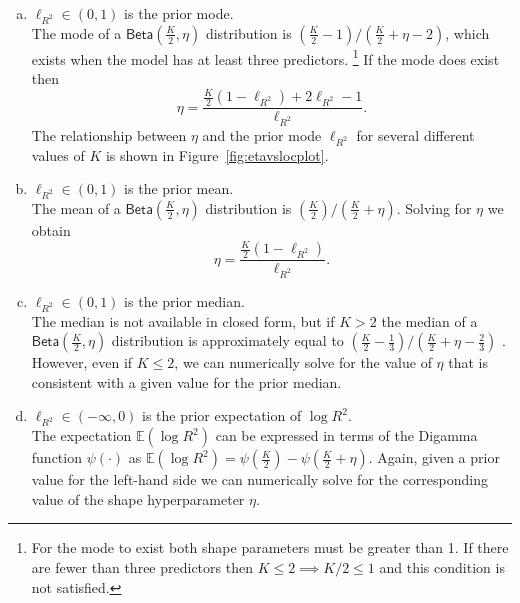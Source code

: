 \documentclass[11pt]{article}
\newcommand{\locRsq}{\ell_{R^2}}
\newcommand{\halfK}{\frac{K}{2}}
\newcommand{\Betadist}[2]{\mathsf{Beta}\left(#1,#2\right)}
\newcommand{\Digamma}[1]{\psi\left(#1\right)}
\begin{document}
\begin{enumerate}[(a)]
\item $\locRsq \in \left(0,1\right)$ is the prior mode. \\[5pt]
%
The mode of a $\Betadist{\halfK}{\eta}$ distribution is
$\left(\halfK - 1\right) / \left(\halfK + \eta - 2\right)$, which exists when
the model has at least three predictors.%
\footnote{For the mode to exist both shape parameters must be greater than 1. If
there are fewer than three predictors then $K \leq 2 \implies K/2 \leq 1$ and
this condition is not satisfied.}
If the mode does exist then
%
$$\eta = \frac{\halfK \left(1 - \locRsq\right) + 2\locRsq - 1}{\locRsq}.$$
%
The relationship between $\eta$ and the prior mode $\locRsq$ for
several different values of $K$ is shown in Figure~\ref{fig:etavslocplot}.

\item $\locRsq \in \left(0,1\right)$ is the prior mean. \\[5pt]
%
The mean of a $\Betadist{\halfK}{\eta}$ distribution is
$\left(\halfK\right) / \left(\halfK + \eta\right)$. Solving for $\eta$ we obtain
%
$$\eta = \frac{\halfK \left(1 - \locRsq \right)}{\locRsq}.$$

\item $\locRsq \in \left(0,1\right)$ is the prior median. \\[5pt]
%
The median is not available in closed form, but if $K > 2$ the median of a
$\Betadist{\halfK}{\eta}$ distribution is approximately equal to
$\left(\halfK - \frac{1}{3}\right) / \left(\halfK + \eta - \frac{2}{3}\right)$
\cite{kerman}. However, even if $K \leq 2$, we can numerically solve for the
value of $\eta$ that is consistent with a given value for the prior median.

\item $\locRsq \in \left(-\infty,0\right)$ is the prior expectation of
$\log{R^2}$. \\[5pt]
%
The expectation $\mathbb{E}\left(\log{R^2}\right)$ can be expressed in terms of
the Digamma function $\Digamma{\cdot}$ as
$\mathbb{E}\left(\log{R^2}\right) = \Digamma{\halfK} - \Digamma{\halfK + \eta}$.
Again, given a prior value for the left-hand side we can numerically solve for
the corresponding value of the shape hyperparameter $\eta$.
\end{enumerate}
\end{document}
